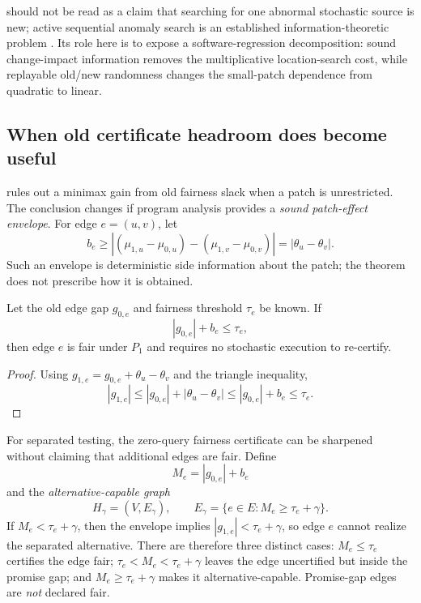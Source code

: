  should not be read as a claim that searching for one
abnormal stochastic source is new; active sequential anomaly search is an
established information-theoretic problem \cite{CohenZhao2015}.  Its role here is
to expose a software-regression decomposition: sound change-impact information
removes the multiplicative location-search cost, while replayable old/new
randomness changes the small-patch dependence from quadratic to linear.


\subsection{When old certificate headroom does become useful}

 rules out a minimax gain from old fairness slack
when a patch is unrestricted.  The conclusion changes if program analysis
provides a \emph{sound patch-effect envelope}.  For edge \(e=(u,v)\), let
\[
b_e
\ge
|(\mu_{1,u}-\mu_{0,u})-(\mu_{1,v}-\mu_{0,v})|
=
|\theta_u-\theta_v|.
\]
Such an envelope is deterministic side information about the patch; the theorem
does not prescribe how it is obtained.

\begin{proposition}
\label{prop:certificate-pruning}
Let the old edge gap \(g_{0,e}\) and fairness threshold \(\tau_e\) be known.  If
\[
|g_{0,e}|+b_e\le\tau_e,
\]
then edge \(e\) is fair under \(P_1\) and requires no stochastic execution to
re-certify.
\end{proposition}

\begin{proof}
Using \(g_{1,e}=g_{0,e}+\theta_u-\theta_v\) and the triangle inequality,
\[
|g_{1,e}|
\le
|g_{0,e}|+|\theta_u-\theta_v|
\le
|g_{0,e}|+b_e
\le
\tau_e.
\]
\end{proof}

For separated testing, the zero-query fairness certificate can be sharpened
without claiming that additional edges are fair.  Define
\[
M_e=|g_{0,e}|+b_e
\]
and the \emph{alternative-capable graph}
\[
H_\gamma=(V,E_\gamma),
\qquad
E_\gamma=
\{e\in E:M_e\ge\tau_e+\gamma\}.
\]
If \(M_e<\tau_e+\gamma\), then the envelope implies
\(|g_{1,e}|<\tau_e+\gamma\), so edge \(e\) cannot realize the separated
alternative.  There are therefore three distinct cases: \(M_e\le\tau_e\)
certifies the edge fair; \(\tau_e<M_e<\tau_e+\gamma\) leaves the edge
uncertified but inside the promise gap; and \(M_e\ge\tau_e+\gamma\) makes it
alternative-capable.  Promise-gap edges are \emph{not} declared fair.

